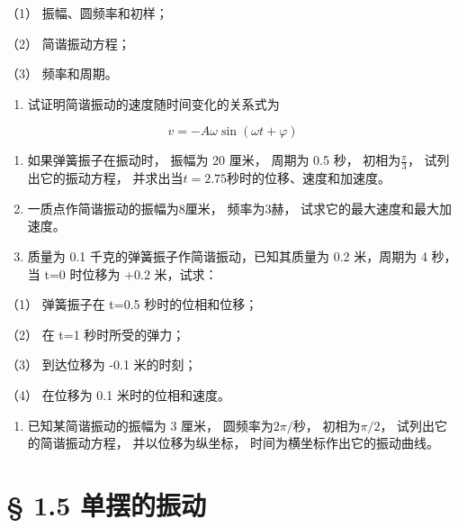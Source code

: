 （1） 振幅、圆频率和初样；

（2） 简谐振动方程；

（3） 频率和周期。

\begin{enumerate}
\def\labelenumi{\arabic{enumi}.}
\setcounter{enumi}{8}
\tightlist
\item
  试证明简谐振动的速度随时间变化的关系式为
\end{enumerate}

\[
v=-A\omega\sin(\omega t+\varphi)
\]

\begin{enumerate}
\def\labelenumi{\arabic{enumi}.}
\setcounter{enumi}{9}
\item
  如果弹簧振子在振动时， 振幅为 20 厘米， 周期为 0.5 秒，
  初相为\(\frac{\pi}{3}\)， 试列出它的振动方程，
  并求出当\(t = 2.75\)秒时的位移、速度和加速度。
\item
  一质点作简谐振动的振幅为8厘米， 频率为3赫，
  试求它的最大速度和最大加速度。
\item
  质量为 0.1 千克的弹簧振子作简谐振动，已知其质量为 0.2 米，周期为 4
  秒，当 t=0 时位移为 +0.2 米，试求：
\end{enumerate}

（1） 弹簧振子在 t=0.5 秒时的位相和位移；

（2） 在 t=1 秒时所受的弹力；

（3） 到达位移为 -0.1 米的时刻；

（4） 在位移为 0.1 米时的位相和速度。

\begin{enumerate}
\def\labelenumi{\arabic{enumi}.}
\setcounter{enumi}{12}
\tightlist
\item
  已知某简谐振动的振幅为 3 厘米， 圆频率为\(2\pi / \text{秒}\)，
  初相为\(\pi / 2\)， 试列出它的简谐振动方程， 并以位移为纵坐标，
  时间为横坐标作出它的振动曲线。
\end{enumerate}

\section{§ 1.5 单摆的振动}\label{ux5355ux6446ux7684ux632fux52a8}

